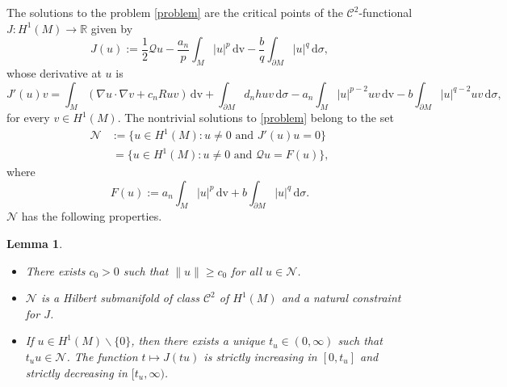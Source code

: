 \documentclass[reqno,11pt,oneside]{amsart}
\newtheorem{lemma}[theorem]{Lemma}
\numberwithin{equation}{section}
\def\r{\mathbb{R}}
\def\im{\int_{M}}
\def\idm{\int_{\partial M}}
\def\cC{\mathcal{C}}
\def\cN{\mathcal{N}}
\def\d{\,\mathrm{d}}
\def\dv{\,\mathrm{dv}}
\begin{document}
The solutions to the problem \eqref{problem} are the critical points of the $\cC^2$-functional $J:H^1(M)\to\r$ given by
\begin{equation}\label{eq:J}
J(u):=\frac{1}{2}\mathscr{Q}u - \frac{a_n}{p}\im |u|^p\dv - \frac{b}{q}\idm |u|^q\d \sigma,
\end{equation}
whose derivative at $u$ is
\begin{equation}\label{eq:derivative}
J'(u)v=\im(\nabla u\cdot\nabla v+c_nRuv)\dv+\idm d_nhuv\d \sigma - a_n\im |u|^{p-2}uv \dv - b\idm |u|^{q-2}uv\d\sigma,
\end{equation}
for every $v\in H^1(M)$. The nontrivial solutions to \eqref{problem} belong to the set
\begin{align*}
\cN&:=\{u\in H^1(M): u\neq 0 \text{ and }J'(u)u=0\} \\
&\,=\Big\{u\in H^1(M): u\neq 0 \text{ and }\mathscr{Q} u=F(u)\Big\},
\end{align*}
where 
\begin{equation}\label{eq:F}
F(u):=a_n\im |u|^p \dv + b\idm|u|^q\d\sigma.
\end{equation}
$\cN$ has the following properties.

\begin{lemma}\label{lem:nehari}
\begin{itemize}
\item[$(a)$]There exists $c_0>0$ such that $\|u\|\geq c_0$ for all $u\in\cN$.
\item[$(b)$]$\cN$ is a Hilbert submanifold of class $\cC^2$ of $H^1(M)$ and a natural constraint for $J$.
\item[$(c)$]If $u\in H^1(M)\smallsetminus\{0\}$, then there exists a unique $t_u\in(0,\infty)$ such that $t_uu\in\cN$. The function $t\mapsto J(tu)$ is strictly increasing in $[0,t_u]$ and strictly decreasing in $[t_u,\infty)$.
\end{itemize}
\end{lemma}
\end{document}
